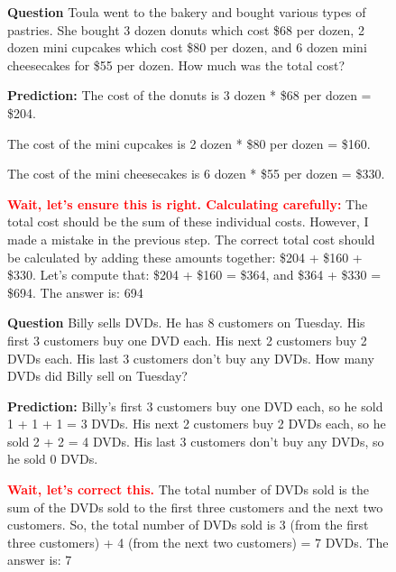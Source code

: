 
\begin{figure}
    \centering
    \small
    \begin{tcolorbox}[boxrule=0.5mm, left=1mm, right=1mm, top=1mm, bottom=1mm,title=\textbf{Example 1}]
        \textbf{Question}
        Toula went to the bakery and bought various types of pastries. She bought 3 dozen donuts which cost \$68 per dozen, 2 dozen mini cupcakes which cost \$80 per dozen, and 6 dozen mini cheesecakes for \$55 per dozen. How much was the total cost?

        \textbf{Prediction:} 
        The cost of the donuts is 3 dozen * \$68 per dozen = \$204.
        
        The cost of the mini cupcakes is 2 dozen * \$80 per dozen = \$160.
        
        The cost of the mini cheesecakes is 6 dozen * \$55 per dozen = \$330.
        
        \textcolor{red}{\textbf{Wait, let's ensure this is right. Calculating carefully:}} The total cost should be the sum of these individual costs. However, I made a mistake in the previous step. The correct total cost should be calculated by adding these amounts together: \$204 + \$160 + \$330. Let's compute that: \$204 + \$160 = \$364, and \$364 + \$330 = \$694. The answer is: 694

    \end{tcolorbox}

    \begin{tcolorbox}[boxrule=0.5mm, left=1mm, right=1mm, top=1mm, bottom=1mm,title=\textbf{Example 2}]
        \textbf{Question}
        Billy sells DVDs. He has 8 customers on Tuesday. His first 3 customers buy one DVD each.  His next 2 customers buy 2 DVDs each.  His last 3 customers don't buy any DVDs. How many DVDs did Billy sell on Tuesday?

        \textbf{Prediction:} 
        Billy's first 3 customers buy one DVD each, so he sold 1 + 1 + 1 = 3 DVDs.
        His next 2 customers buy 2 DVDs each, so he sold 2 + 2 = 4 DVDs.
        His last 3 customers don't buy any DVDs, so he sold 0 DVDs.
        
        \textcolor{red}{\textbf{Wait, let's correct this.}} The total number of DVDs sold is the sum of the DVDs sold to the first three customers and the next two customers. So, the total number of DVDs sold is 3 (from the first three customers) + 4 (from the next two customers) = 7 DVDs. The answer is: 7

    \end{tcolorbox}


\end{figure}
